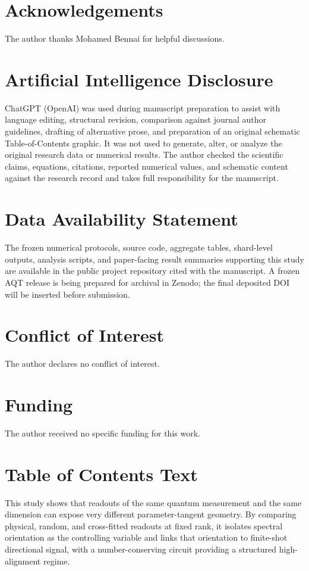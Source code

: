 \documentclass[11pt]{article}
\begin{document}




\section*{Acknowledgements}
The author thanks Mohamed Bennai for helpful discussions.

\section*{Artificial Intelligence Disclosure}
ChatGPT (OpenAI) was used during manuscript preparation to assist with language editing, structural revision, comparison against journal author guidelines, drafting of alternative prose, and preparation of an original schematic Table-of-Contents graphic. It was not used to generate, alter, or analyze the original research data or numerical results. The author checked the scientific claims, equations, citations, reported numerical values, and schematic content against the research record and takes full responsibility for the manuscript.

\section*{Data Availability Statement}
The frozen numerical protocols, source code, aggregate tables, shard-level outputs, analysis scripts, and paper-facing result summaries supporting this study are available in the public project repository cited with the manuscript. A frozen AQT release is being prepared for archival in Zenodo; the final deposited DOI will be inserted before submission.

\section*{Conflict of Interest}
The author declares no conflict of interest.

\section*{Funding}
The author received no specific funding for this work.

\section*{Table of Contents Text}
This study shows that readouts of the same quantum measurement and the same dimension can expose very different parameter-tangent geometry. By comparing physical, random, and cross-fitted readouts at fixed rank, it isolates spectral orientation as the controlling variable and links that orientation to finite-shot directional signal, with a number-conserving circuit providing a structured high-alignment regime.
\end{document}
